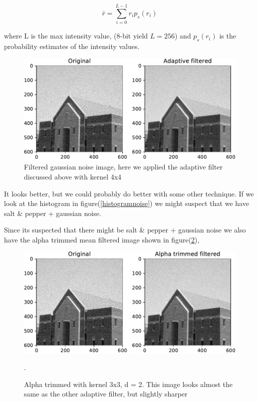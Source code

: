 {\begin{equation}
    \bar{r} = \sum_{i=0}^{L-1}r_{i}p_{s}(r_{i})
    \label{mean}
\end{equation}

where L is the max intensity value, (8-bit yield $L = 256$) and $p_{s}(r_{i})$ is the probability estimates of the intensity values.

\begin{figure}[!htb]
    {\centering
        \includegraphics[width=1\textwidth]{gaussianfiltered.pdf}
        \caption{Filtered gaussian noise image, here we applied the adaptive filter discussed above with kernel 4x4 }
        \label{adaptivefig}
    \par}
    \end{figure}

It looks better, but we could probably do better with some other technique. If we look at the histogram in figure(\ref{histogramnoise}) we might suspect that we have salt \& pepper + gaussian noise.

Since its suspected that there might be salt \& pepper + gaussian noise we also have the alpha trimmed mean filtered image shown in figure(\ref{alphatrimmed}),

\begin{figure}[!htb]
    {\centering
        \includegraphics[width=1\textwidth]{alphatrimmed.pdf}
        \caption{Alpha trimmed with kernel 3x3, d = 2. This image looks almost the same as the other adaptive filter, but slightly sharper}.
        \label{alphatrimmed}
    \par}
    \end{figure}

}
